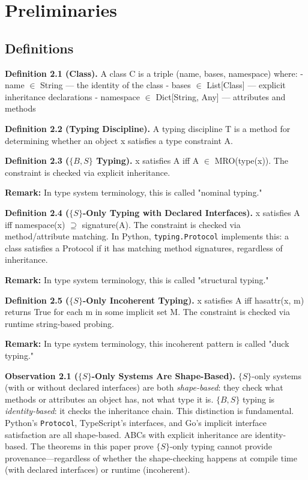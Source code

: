 \section{Preliminaries}\label{preliminaries}

\subsection{Definitions}\label{definitions}

\textbf{Definition 2.1 (Class).} A class C is a triple (name, bases,
namespace) where: - name \(\in\) String --- the identity of the class -
bases \(\in\) List{[}Class{]} --- explicit inheritance declarations -
namespace \(\in\) Dict{[}String, Any{]} --- attributes and methods

\textbf{Definition 2.2 (Typing Discipline).} A typing discipline T is a
method for determining whether an object x satisfies a type constraint
A.

\textbf{Definition 2.3 ($\{B,S\}$ Typing).} x satisfies A iff A \(\in\)
MRO(type(x)). The constraint is checked via explicit inheritance.

\textbf{Remark:} In type system terminology, this is called "nominal typing."

\textbf{Definition 2.4 ($\{S\}$-Only Typing with Declared Interfaces).} x satisfies A iff
namespace(x) \(\supseteq\) signature(A). The constraint is checked via
method/attribute matching. In Python, \texttt{typing.Protocol}
implements this: a class satisfies a Protocol if it has
matching method signatures, regardless of inheritance.

\textbf{Remark:} In type system terminology, this is called "structural typing."

\textbf{Definition 2.5 ($\{S\}$-Only Incoherent Typing).} x satisfies A iff hasattr(x, m)
returns True for each m in some implicit set M. The constraint is
checked via runtime string-based probing.

\textbf{Remark:} In type system terminology, this incoherent pattern is called "duck typing."

\textbf{Observation 2.1 ($\{S\}$-Only Systems Are Shape-Based).} $\{S\}$-only systems (with or without declared interfaces) are both \emph{shape-based}: they check what methods or
attributes an object has, not what type it is. $\{B,S\}$ typing is
\emph{identity-based}: it checks the inheritance chain. This distinction
is fundamental. Python's \texttt{Protocol}, TypeScript's interfaces, and
Go's implicit interface satisfaction are all shape-based. ABCs with
explicit inheritance are identity-based. The theorems in this paper
prove $\{S\}$-only typing cannot provide provenance---regardless of
whether the shape-checking happens at compile time (with declared interfaces) or
runtime (incoherent).

